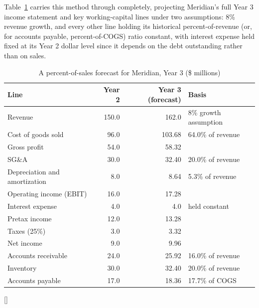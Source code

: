 \documentclass[../ai_in_finance]{subfiles}
\begin{document}
Table~\ref{tab:forecast} carries this method through completely, projecting Meridian's full Year 3 income statement and key working-capital lines under two assumptions: 8\% revenue growth, and every other line holding its historical percent-of-revenue (or, for accounts payable, percent-of-COGS) ratio constant, with interest expense held fixed at its Year 2 dollar level since it depends on the debt outstanding rather than on sales.

\begin{table}[htbp]
\centering
\begin{lrbox}{\bookmeasuredbox}
\begin{tabular}{lrrl}
\toprule
Line & Year 2 & Year 3 (forecast) & Basis \\
\midrule
Revenue & 150.0 & 162.0 & 8\% growth assumption \\
Cost of goods sold & 96.0 & 103.68 & 64.0\% of revenue \\
Gross profit & 54.0 & 58.32 & \\
SG\&A & 30.0 & 32.40 & 20.0\% of revenue \\
Depreciation and amortization & 8.0 & 8.64 & 5.3\% of revenue \\
Operating income (EBIT) & 16.0 & 17.28 & \\
Interest expense & 4.0 & 4.0 & held constant \\
Pretax income & 12.0 & 13.28 & \\
Taxes (25\%) & 3.0 & 3.32 & \\
Net income & 9.0 & 9.96 & \\
\midrule
Accounts receivable & 24.0 & 25.92 & 16.0\% of revenue \\
Inventory & 30.0 & 32.40 & 20.0\% of revenue \\
Accounts payable & 17.0 & 18.36 & 17.7\% of COGS \\
\bottomrule
\end{tabular}
\end{lrbox}
\ifdim\wd\bookmeasuredbox<0.65\linewidth
\setlength{\bookcapwidth}{0.65\linewidth}
\else
\setlength{\bookcapwidth}{\wd\bookmeasuredbox}
\fi
{}[\bookcapwidth]{
\usebox{\bookmeasuredbox}
}{
\caption{A percent-of-sales forecast for Meridian, Year 3 (\$ millions)}
\label{tab:forecast}
}
\end{table}
\end{document}
